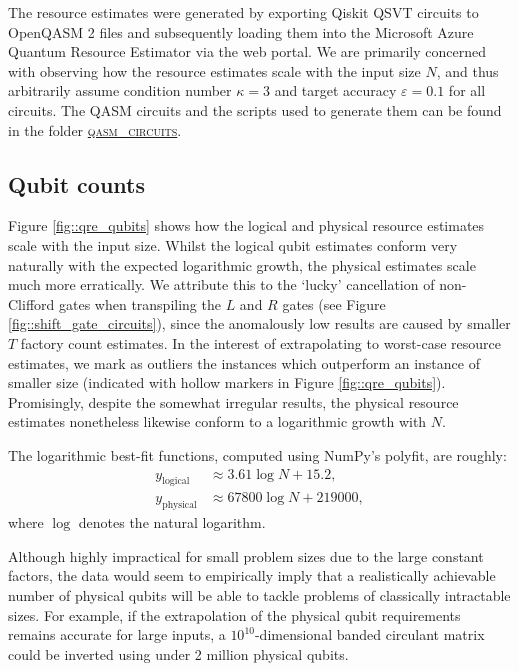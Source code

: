 \documentclass[10pt, twocolumn]{article}
\begin{document}
The resource estimates were generated by exporting Qiskit QSVT circuits to OpenQASM 2 files and subsequently loading them into the Microsoft Azure Quantum Resource Estimator via the web portal. We are primarily concerned with observing how the resource estimates scale with the input size $N$, and thus arbitrarily assume condition number $\kappa=3$ and target accuracy $\varepsilon=0.1$ for all circuits. The QASM circuits and the scripts used to generate them can be found in the folder \href{https://github.com/Walden-Killick/QCE24-QRE-Challenge/tree/main/qasm_circuits}{\textsc{qasm\_circuits}}.

\subsection{Qubit counts}

Figure \ref{fig::qre_qubits} shows how the logical and physical resource estimates scale with the input size. Whilst the logical qubit estimates conform very naturally with the expected logarithmic growth, the physical estimates scale much more erratically. We attribute this to the `lucky' cancellation of non-Clifford gates when transpiling the $L$ and $R$ gates (see Figure \ref{fig::shift_gate_circuits}), since the anomalously low results are caused by smaller $T$ factory count estimates. In the interest of extrapolating to worst-case resource estimates, we mark as outliers the instances which outperform an instance of smaller size (indicated with hollow markers in Figure \ref{fig::qre_qubits}). Promisingly, despite the somewhat irregular results, the physical resource estimates nonetheless likewise conform to a logarithmic growth with $N$.

The logarithmic best-fit functions, computed using NumPy's polyfit, are roughly:
\begin{align*}
	y_\text{logical} &\approx 3.61 \log{N} + 15.2, \\
	y_\text{physical} &\approx 67800 \log{N} + 219000,
\end{align*}
where $\log$ denotes the natural logarithm.

Although highly impractical for small problem sizes due to the large constant factors, the data would seem to empirically imply that a realistically achievable number of physical qubits will be able to tackle problems of classically intractable sizes. For example, if the extrapolation of the physical qubit requirements remains accurate for large inputs, a $10^{10}$-dimensional banded circulant matrix could be inverted using under 2 million physical qubits.
\end{document}
